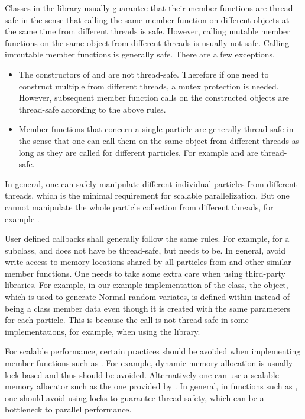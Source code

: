 Classes in the \vsmc library usually guarantee that their member functions are
thread-safe in the sense that calling the same member function on different
objects at the same time from different threads is safe. However, calling
mutable member functions on the same object from different threads is usually
not safe. Calling immutable member functions is generally safe. There are a
few exceptions,
\begin{itemize}
  \item The constructors of  and  are
    not thread-safe. Therefore if one need to construct multiple
     from different threads, a mutex protection is needed.
    However, subsequent member function calls on the constructed objects are
    thread-safe according to the above rules.
  \item Member functions that concern a single particle are generally
    thread-safe in the sense that one can call them on the same object from
    different threads as long as they are called for different particles. For
    example  and  are
    thread-safe.
\end{itemize}
In general, one can safely manipulate different individual particles from
different threads, which is the minimal requirement for scalable
parallelization. But one cannot manipulate the whole particle collection from
different threads, for example .

User defined callbacks shall generally follow the same rules. For example, for
a  subclass,  and
 does not have be thread-safe, but
 needs to be. In general, avoid write access to memory
locations shared by all particles from  and other
similar member functions. One needs to take some extra care when using
third-party libraries. For example, in our example implementation of the
 class, the  object, which is used to
generate Normal random variates, is defined within 
instead of being a class member data even though it is created with the same
parameters for each particle. This is because the call
 is not thread-safe in some implementations, for
example, when using the \boost library.

For scalable performance, certain practices should be avoided when
implementing member functions such as . For example,
dynamic memory allocation is usually lock-based and thus should be avoided.
Alternatively one can use a scalable memory allocator such as the one provided
by \tbb. In general, in functions such as , one should
avoid using locks to guarantee thread-safety, which can be a bottleneck to
parallel performance.
